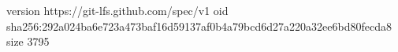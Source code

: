 version https://git-lfs.github.com/spec/v1
oid sha256:292a024ba6e723a473baf16d59137af0b4a79bcd6d27a220a32ee6bd80fecda8
size 3795
